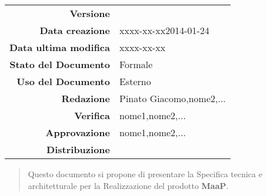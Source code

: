 


\newcommand{\Versione}{\versioneSpecificaTecnica{}}	  %
\newcommand{\Data}{xxxx-xx-xx}				           %
\newcommand{\DataUltimaModifica}{xxxx-xx-xx}
\newcommand{\TipoDocumento}{Specifica Tecnica}	       %




\begin{center}
\begin{tabular}{r|l}
\textbf{Versione} & \Versione{} \\
\textbf{Data creazione} & \Data{2014-01-24} \\
\textbf{Data ultima modifica} & \DataUltimaModifica{} \\
\textbf{Stato del Documento} & Formale \\		          %
\textbf{Uso del Documento} & Esterno \\			          %
\textbf{Redazione} &  Pinato Giacomo,nome2,...\\		        %
\textbf{Verifica} & nome1,nome2,...\\			        %
\textbf{Approvazione} & nome1,nome2,...\\				 %
\textbf{Distribuzione} & \parbox[t]{4cm}{\NomeGruppo{}}\\
\end{tabular}
\end{center}

\vspace{0.05in}

\begin{abstract}
\begin{center}
Questo documento si propone di presentare la Specifica tecnica e architetturale per la Realizzazione del prodotto \textbf{MaaP}.
\end{center}
\end{abstract}


